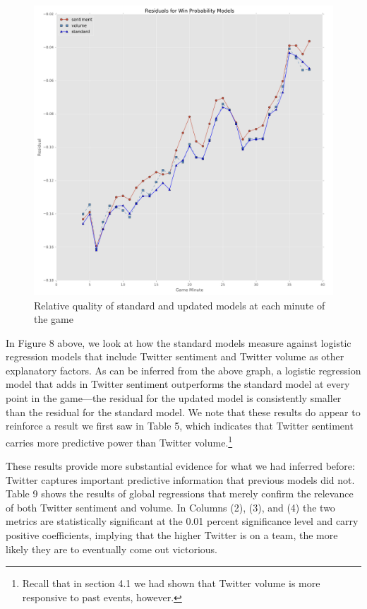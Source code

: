 \documentclass[12pt]{article}
\begin{document}
\begin{doublespacing}
\begin{figure} [H]
	\centering
	\includegraphics[scale = 0.4] {Images/VolumeSentResidualPlot.png} 
	\caption{Relative quality of standard and updated models at each minute of the game}
\end{figure}

In Figure 8 above, we look at how the standard models measure against logistic regression models that include Twitter sentiment and Twitter volume as other explanatory factors. As can be inferred from the above graph, a logistic regression model that adds in Twitter sentiment outperforms the standard model at every point in the game---the residual for the updated model is consistently smaller than the residual for the standard model. We note that these results do appear to reinforce a result we first saw in Table 5, which indicates that Twitter sentiment carries more predictive power than Twitter volume.\footnote{Recall that in section 4.1 we had shown that Twitter volume is more responsive to past events, however.}

These results provide more substantial evidence for what we had inferred before: Twitter captures important predictive information that previous models did not. Table 9 shows the results of global regressions that merely confirm the relevance of both Twitter sentiment and volume. In Columns (2), (3), and (4) the two metrics are statistically significant at the 0.01 percent significance level and carry positive coefficients, implying that the higher Twitter is on a team, the more likely they are to eventually come out victorious. 


\end{doublespacing}
\end{document}

